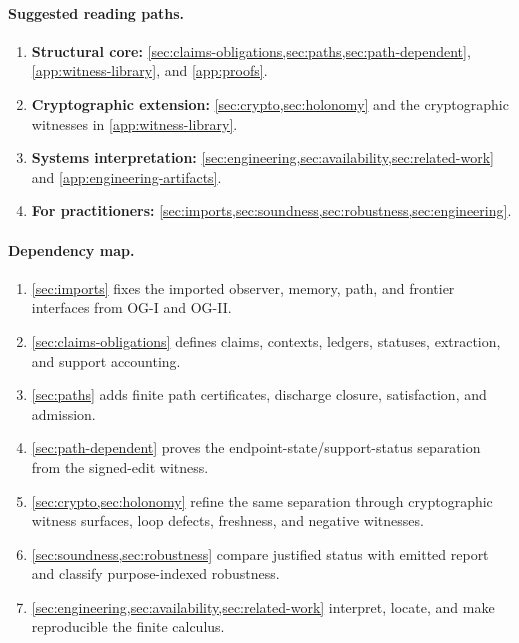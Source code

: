 \documentclass[11pt,twoside]{article}
\theoremstyle{definition}
\begin{document}
\paragraph{Suggested reading paths.}
\begin{enumerate}[leftmargin=*,label=\arabic*.]
  \item \textbf{Structural core:}
        \cref{sec:claims-obligations,sec:paths,sec:path-dependent},
        \cref{app:witness-library}, and \cref{app:proofs}.
  \item \textbf{Cryptographic extension:}
        \cref{sec:crypto,sec:holonomy} and the cryptographic witnesses in
        \cref{app:witness-library}.
  \item \textbf{Systems interpretation:}
        \cref{sec:engineering,sec:availability,sec:related-work} and
        \cref{app:engineering-artifacts}.
  \item \textbf{For practitioners:}
        \cref{sec:imports,sec:soundness,sec:robustness,sec:engineering}.
\end{enumerate}

\paragraph{Dependency map.}
\begin{enumerate}[leftmargin=*,label=\arabic*.]
  \item \cref{sec:imports} fixes the imported observer, memory, path, and
        frontier interfaces from OG-I and OG-II.
  \item \cref{sec:claims-obligations} defines claims, contexts, ledgers,
        statuses, extraction, and support accounting.
  \item \cref{sec:paths} adds finite path certificates, discharge closure,
        satisfaction, and admission.
  \item \cref{sec:path-dependent} proves the endpoint-state/support-status
        separation from the signed-edit witness.
  \item \cref{sec:crypto,sec:holonomy} refine the same separation through
        cryptographic witness surfaces, loop defects, freshness, and negative
        witnesses.
  \item \cref{sec:soundness,sec:robustness} compare justified status with
        emitted report and classify purpose-indexed robustness.
  \item \cref{sec:engineering,sec:availability,sec:related-work} interpret,
        locate, and make reproducible the finite calculus.
\end{enumerate}
\end{document}
